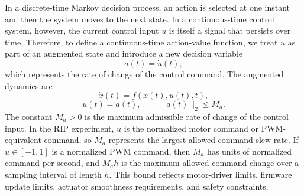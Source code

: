 \documentclass[11pt]{article}
\begin{document}
In a discrete-time Markov decision process, an action is selected at one instant and then the system moves to the next state. In a continuous-time control system, however, the current control input $u$ is itself a signal that persists over time. Therefore, to define a continuous-time action-value function, we treat $u$ as part of an augmented state and introduce a new decision variable
\begin{equation}
a(t)=\dot{u}(t),
\label{eq:action_rate}
\end{equation}
which represents the rate of change of the control command. The augmented dynamics are
\begin{equation}
\dot{x}(t)=f(x(t),u(t),t),
\label{eq:aug_x_dyn}
\end{equation}
\begin{equation}
\dot{u}(t)=a(t),
\qquad \|a(t)\|_2\leq M_a.
\label{eq:aug_u_dyn}
\end{equation}
The constant $M_a>0$ is the maximum admissible rate of change of the control input. In the RIP experiment, $u$ is the normalized motor command or PWM-equivalent command, so $M_a$ represents the largest allowed command slew rate. If $u\in[-1,1]$ is a normalized PWM command, then $M_a$ has units of normalized command per second, and $M_ah$ is the maximum allowed command change over a sampling interval of length $h$. This bound reflects motor-driver limits, firmware update limits, actuator smoothness requirements, and safety constraints.
\end{document}
